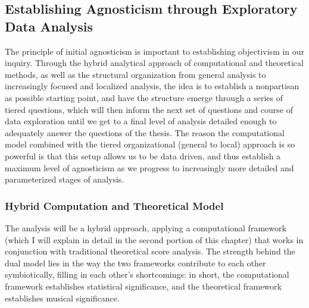     \subsection{Establishing Agnosticism through Exploratory Data
Analysis}\label{establishing-agnosticism-through-exploratory-data-analysis}

The principle of initial agnosticism is important to establishing
objectivism in our inquiry. Through the hybrid analytical approach of
computational and theoretical methods, as well as the structural
organization from general analysis to increasingly focused and localized
analysis, the idea is to establish a nonpartisan as possible starting
point, and have the structure emerge through a series of tiered
questions, which will then inform the next set of questions and course
of data exploration until we get to a final level of analysis detailed
enough to adequately answer the questions of the thesis. The reason the
computational model combined with the tiered organizational (general to
local) approach is so powerful is that this setup allows us to be data
driven, and thus establish a maximum level of agnosticism as we progress
to increasingly more detailed and parameterized stages of analysis.

\subsubsection{Hybrid Computation and Theoretical
Model}\label{hybrid-computation-and-theoretical-model}

The analysis will be a hybrid approach, applying a computational
framework (which I will explain in detail in the second portion of this
chapter) that works in conjunction with traditional theoretical score
analysis. The strength behind the dual model lies in the way the two
frameworks contribute to each other symbiotically, filling in each
other's shortcomings: in short, the computational framework establishes
statistical significance, and the theoretical framework establishes
musical significance.

